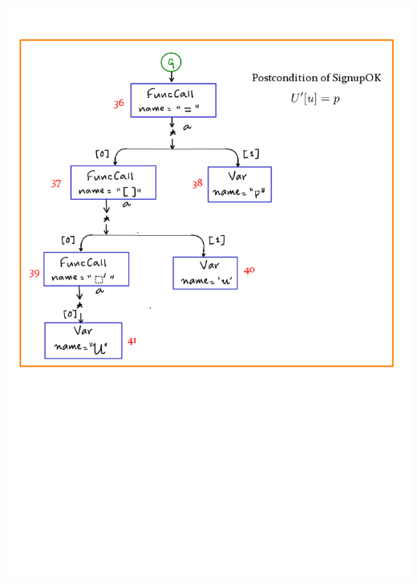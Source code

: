 \documentclass[12pts, a4paper]{article}
\begin{document}
\begin{center}
\includegraphics[width=\textwidth]{../images/spec-AST-6.png}


\end{center}
\end{document}

